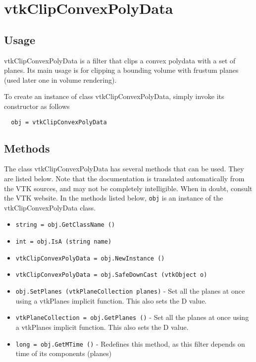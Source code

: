 \section{vtkClipConvexPolyData}

\subsection{Usage}

 vtkClipConvexPolyData is a filter that clips a convex polydata with a set
 of planes. Its main usage is for clipping a bounding volume with frustum
 planes (used later one in volume rendering).

To create an instance of class vtkClipConvexPolyData, simply
invoke its constructor as follows
\begin{verbatim}
  obj = vtkClipConvexPolyData
\end{verbatim}
\subsection{Methods}

The class vtkClipConvexPolyData has several methods that can be used.
  They are listed below.
Note that the documentation is translated automatically from the VTK sources,
and may not be completely intelligible.  When in doubt, consult the VTK website.
In the methods listed below, \verb|obj| is an instance of the vtkClipConvexPolyData class.
\begin{itemize}
\item  \verb|string = obj.GetClassName ()|

\item  \verb|int = obj.IsA (string name)|

\item  \verb|vtkClipConvexPolyData = obj.NewInstance ()|

\item  \verb|vtkClipConvexPolyData = obj.SafeDownCast (vtkObject o)|

\item  \verb|obj.SetPlanes (vtkPlaneCollection planes)| -  Set all the planes at once using a vtkPlanes implicit function.
 This also sets the D value.

\item  \verb|vtkPlaneCollection = obj.GetPlanes ()| -  Set all the planes at once using a vtkPlanes implicit function.
 This also sets the D value.

\item  \verb|long = obj.GetMTime ()| -  Redefines this method, as this filter depends on time of its components
 (planes)

\end{itemize}
